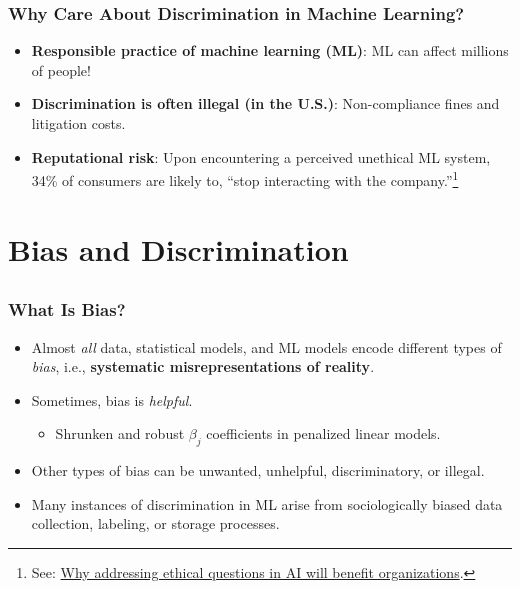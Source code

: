 \documentclass[11pt,aspectratio=169,hyperref={colorlinks}]{beamer}
\begin{document}
		\begin{frame}				
		
			\frametitle{Why Care About Discrimination in Machine Learning?}
			
			\begin{itemize}
				\Large
				\item \textbf{Responsible practice of machine learning (ML)}: ML can affect millions of people! \cite{obermeyer2019dissecting}
				\item \textbf{Discrimination is often illegal (in the U.S.)}: Non-compliance fines and litigation costs.
				\item \textbf{Reputational risk}: Upon encountering a perceived unethical ML system, 34\% of consumers are likely to, ``stop interacting with the company.''\footnote{\scriptsize{See: \href{https://www.capgemini.com/research/why-addressing-ethical-questions-in-ai-will-benefit-organizations/}{Why addressing ethical questions in AI will benefit organizations}.}}
			\end{itemize}
			
		\end{frame}

	\section{Bias and Discrimination}
	
		\subsection*{}
	
		\begin{frame}
		
			\frametitle{What Is Bias?}			
					
			\begin{itemize}
			\item Almost \textit{all} data, statistical models, and ML models encode different types of \textit{bias}, i.e., \textbf{systematic misrepresentations of reality}.\\
			\item Sometimes, bias is \textit{helpful}.
				\begin{itemize}
					\item{Shrunken and robust $\beta_j$ coefficients in penalized linear models.}	\end{itemize}
			\item Other types of bias can be unwanted, unhelpful, discriminatory, or illegal. 
			\item Many instances of discrimination in ML arise from sociologically biased data collection, labeling, or storage processes.
			\end{itemize}
					
		\end{frame}					
		
\end{document}
